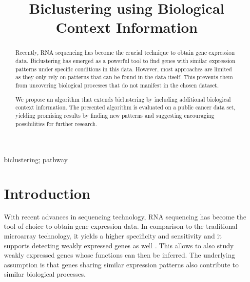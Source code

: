 \documentclass[10pt, conference, compsocconf]{IEEEtran}
\begin{document}
\title{Biclustering using Biological Context Information}


\author{
}

\maketitle

\begin{abstract}
Recently, RNA sequencing has become the crucial technique to obtain gene expression data.
Biclustering has emerged as a powerful tool to find genes with similar expression patterns under specific conditions in this data.
However, most approaches are limited as they only rely on patterns that can be found in the data itself.
This prevents them from uncovering biological processes that do not manifest in the chosen dataset.

We propose an algorithm that extends biclustering by including additional biological context information.
The presented algorithm is evaluated on a public cancer data set, yielding promising results by finding new patterns and suggesting encouraging possibilities for further research.
\end{abstract}

\begin{IEEEkeywords}
biclustering; pathway

\end{IEEEkeywords}

\IEEEpeerreviewmaketitle


\section{Introduction}
\label{sec:introduction}
With recent advances in sequencing technology, RNA sequencing has become the tool of choice to obtain gene expression data.
In comparison to the traditional microarray technology, it yields a higher specificity and sensitivity and it supports detecting weakly expressed genes as well \citep{Zhao14}.
This allows to also study weakly expressed genes whose functions can then be inferred.
The underlying assumption is that genes sharing similar expression patterns also contribute to similar biological processes.
\end{document}
